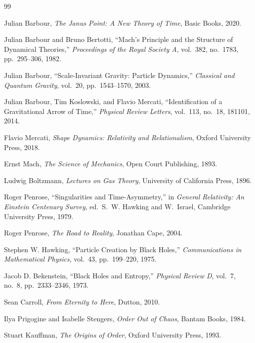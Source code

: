 \documentclass[12pt, a4paper]{article}
\begin{document}
\newpage
\begin{thebibliography}{99}

Julian Barbour,
\textit{The Janus Point: A New Theory of Time},
Basic Books, 2020.

Julian Barbour and Bruno Bertotti,
``Mach's Principle and the Structure of Dynamical Theories,''
\textit{Proceedings of the Royal Society A},
vol.~382, no.~1783, pp.~295--306, 1982.

Julian Barbour,
``Scale-Invariant Gravity: Particle Dynamics,''
\textit{Classical and Quantum Gravity},
vol.~20, pp.~1543--1570, 2003.

Julian Barbour, Tim Koslowski, and Flavio Mercati,
``Identification of a Gravitational Arrow of Time,''
\textit{Physical Review Letters},
vol.~113, no.~18, 181101, 2014.

Flavio Mercati,
\textit{Shape Dynamics: Relativity and Relationalism},
Oxford University Press, 2018.

Ernst Mach,
\textit{The Science of Mechanics},
Open Court Publishing, 1893.

Ludwig Boltzmann,
\textit{Lectures on Gas Theory},
University of California Press, 1896.

Roger Penrose,
``Singularities and Time-Asymmetry,''
in \textit{General Relativity: An Einstein Centenary Survey},
ed.\ S.~W. Hawking and W.~Israel,
Cambridge University Press, 1979.

Roger Penrose,
\textit{The Road to Reality},
Jonathan Cape, 2004.

Stephen W. Hawking,
``Particle Creation by Black Holes,''
\textit{Communications in Mathematical Physics},
vol.~43, pp.~199--220, 1975.

Jacob D. Bekenstein,
``Black Holes and Entropy,''
\textit{Physical Review D},
vol.~7, no.~8, pp.~2333--2346, 1973.

Sean Carroll,
\textit{From Eternity to Here},
Dutton, 2010.

Ilya Prigogine and Isabelle Stengers,
\textit{Order Out of Chaos},
Bantam Books, 1984.

Stuart Kauffman,
\textit{The Origins of Order},
Oxford University Press, 1993.


\end{thebibliography}
\end{document}
